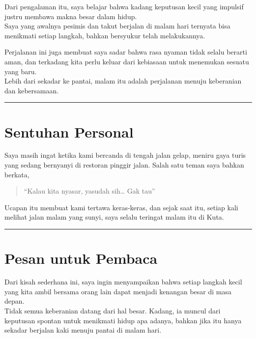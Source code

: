 \documentclass[
  letterpaper,
  DIV=11,
  numbers=noendperiod]{scrreprt}
\begin{document}
Dari pengalaman itu, saya belajar bahwa kadang keputusan kecil yang
impulsif justru membawa makna besar dalam hidup.\\
Saya yang awalnya pesimis dan takut berjalan di malam hari ternyata bisa
menikmati setiap langkah, bahkan bersyukur telah melakukannya.

Perjalanan ini juga membuat saya sadar bahwa rasa nyaman tidak selalu
berarti aman, dan terkadang kita perlu keluar dari kebiasaan untuk
menemukan sesuatu yang baru.\\
Lebih dari sekadar ke pantai, malam itu adalah perjalanan menuju
keberanian dan kebersamaan.

\begin{center}\rule{0.5\linewidth}{0.5pt}\end{center}

\section{Sentuhan Personal}\label{sentuhan-personal}

Saya masih ingat ketika kami bercanda di tengah jalan gelap, meniru gaya
turis yang sedang bernyanyi di restoran pinggir jalan. Salah satu teman
saya bahkan berkata,

\begin{quote}
``Kalau kita nyasar, yasudah sih\ldots{} Gak tau''
\end{quote}

Ucapan itu membuat kami tertawa keras-keras, dan sejak saat itu, setiap
kali melihat jalan malam yang sunyi, saya selalu teringat malam itu di
Kuta.

\begin{center}\rule{0.5\linewidth}{0.5pt}\end{center}

\section{Pesan untuk Pembaca}\label{pesan-untuk-pembaca}

Dari kisah sederhana ini, saya ingin menyampaikan bahwa setiap langkah
kecil yang kita ambil bersama orang lain dapat menjadi kenangan besar di
masa depan.\\
Tidak semua keberanian datang dari hal besar. Kadang, ia muncul dari
keputusan spontan untuk menikmati hidup apa adanya, bahkan jika itu
hanya sekadar berjalan kaki menuju pantai di malam hari.

\end{document}
